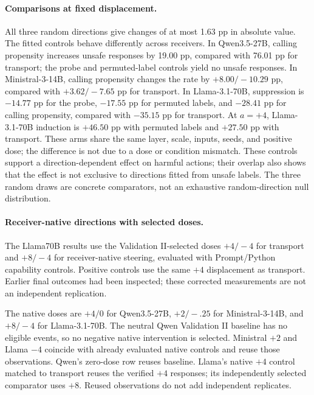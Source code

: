 \paragraph{Comparisons at fixed displacement.}
All three random directions give changes of at most 1.63 pp in absolute value. The fitted controls behave differently across receivers. In Qwen3.5-27B, calling propensity increases unsafe responses by 19.00 pp, compared with 76.01 pp for transport; the probe and permuted-label controls yield no unsafe responses. In Ministral-3-14B, calling propensity
changes the rate by $+8.00/-10.29$ pp, compared with $+3.62/-7.65$ pp for transport. In Llama-3.1-70B, suppression is $-14.77$ pp for the probe, $-17.55$ pp for permuted labels, and $-28.41$ pp for calling propensity, compared with $-35.15$ pp for transport. At $a=+4$, Llama-3.1-70B induction is $+46.50$ pp with permuted labels and $+27.50$ pp with transport. These arms share the same layer, scale, inputs, seeds, and positive dose; the difference is not due to a dose or condition mismatch. These controls support a direction-dependent effect on harmful actions; their overlap also shows that the effect is not exclusive to directions fitted from unsafe labels. The three random draws are concrete comparators, not an exhaustive random-direction null distribution.

\paragraph{Receiver-native directions with selected doses.}
The Llama70B results use the Validation II-selected doses $+4/-4$ for
transport and $+8/-4$ for receiver-native steering, evaluated with
Prompt/Python capability controls. Positive controls use the same $+4$
displacement as transport. Earlier final outcomes had been inspected;
these corrected measurements are not an independent replication.

The native doses are $+4/0$ for Qwen3.5-27B, $+2/-.25$ for Ministral-3-14B, and $+8/-4$ for Llama-3.1-70B. The neutral Qwen Validation II baseline has no eligible events, so no negative native intervention is selected. Ministral $+2$ and Llama $-4$ coincide with already evaluated native controls and reuse those observations. Qwen's zero-dose row reuses baseline. Llama's native $+4$ control matched to transport reuses the verified $+4$ responses; its independently selected comparator uses $+8$. Reused observations do not add independent replicates.



